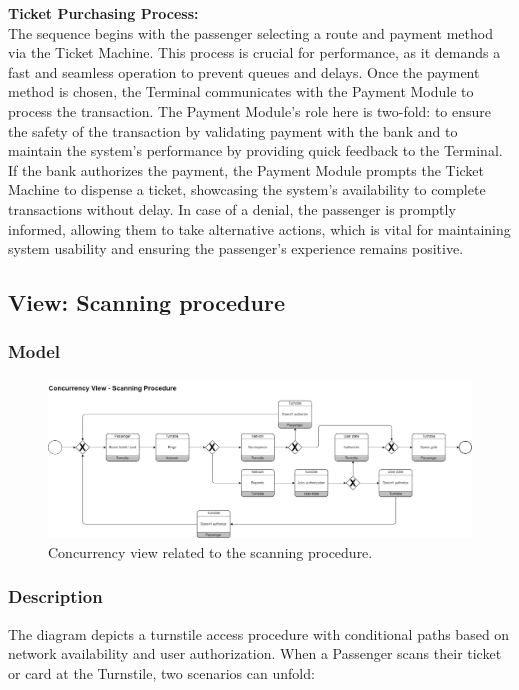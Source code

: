 \textbf{Ticket Purchasing Process:} \\
The sequence begins with the passenger selecting a route and payment method via the Ticket Machine. This process is crucial for performance, as it demands a fast and seamless operation to prevent queues and delays. Once the payment method is chosen, the Terminal communicates with the Payment Module to process the transaction. The Payment Module's role here is two-fold: to ensure the safety of the transaction by validating payment with the bank and to maintain the system's performance by providing quick feedback to the Terminal. If the bank authorizes the payment, the Payment Module prompts the Ticket Machine to dispense a ticket, showcasing the system's availability to complete transactions without delay. In case of a denial, the passenger is promptly informed, allowing them to take alternative actions, which is vital for maintaining system usability and ensuring the passenger's experience remains positive. \\
\subsection{View: Scanning procedure}
\subsubsection{Model}
\begin{figure}[H]
    \centering
    \includegraphics[width=\textwidth]{drawings/views_final_version/concurrency_view_2.png}
    \caption{Concurrency view related to the scanning procedure.}
    \label{fig:concurrency_view_2}
\end{figure}

\subsubsection{Description}
The diagram depicts a turnstile access procedure with conditional paths based on network availability and user authorization. When a Passenger scans their ticket or card at the Turnstile, two scenarios can unfold:

